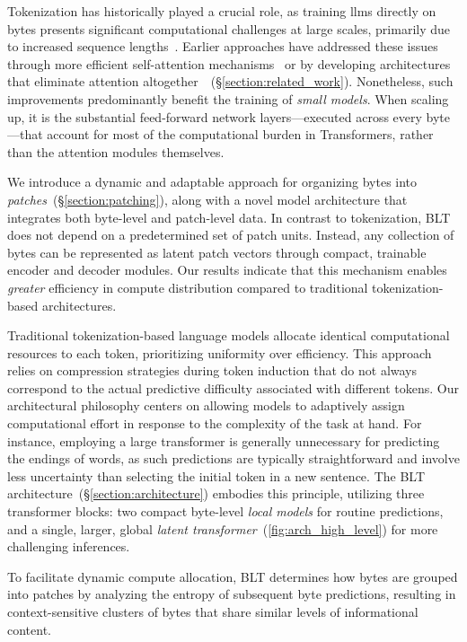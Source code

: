 Tokenization has historically played a crucial role, as training llms directly on bytes presents significant computational challenges at large scales, primarily due to increased sequence lengths~\citep{xue2022byt5}. Earlier approaches have addressed these issues through more efficient self-attention mechanisms~\citep{el2020characterbert, clark2022canine} or by developing architectures that eliminate attention altogether~\citep{wang2024mambabyte}~(\S\ref{section:related_work}). Nonetheless, such improvements predominantly benefit the training of \textit{small models}. When scaling up, it is the substantial feed-forward network layers—executed across every byte—that account for most of the computational burden in Transformers, rather than the attention modules themselves.

We introduce a dynamic and adaptable approach for organizing bytes into \textit{patches}~(\S\ref{section:patching}), along with a novel model architecture that integrates both byte-level and patch-level data. In contrast to tokenization, {\textsc BLT} does not depend on a predetermined set of patch units. Instead, any collection of bytes can be represented as latent patch vectors through compact, trainable encoder and decoder modules. Our results indicate that this mechanism enables \textit{greater} efficiency in compute distribution compared to traditional tokenization-based architectures.

Traditional tokenization-based language models allocate identical computational resources to each token, prioritizing uniformity over efficiency. This approach relies on compression strategies during token induction that do not always correspond to the actual predictive difficulty associated with different tokens. Our architectural philosophy centers on allowing models to adaptively assign computational effort in response to the complexity of the task at hand. For instance, employing a large transformer is generally unnecessary for predicting the endings of words, as such predictions are typically straightforward and involve less uncertainty than selecting the initial token in a new sentence. The {\textsc BLT} architecture~(\S\ref{section:architecture}) embodies this principle, utilizing three transformer blocks: two compact byte-level \textit{local models} for routine predictions, and a single, larger, global \textit{latent transformer}~(\autoref{fig:arch_high_level}) for more challenging inferences. 

To facilitate dynamic compute allocation, {\textsc BLT} determines how bytes are grouped into patches by analyzing the entropy of subsequent byte predictions, resulting in context-sensitive clusters of bytes that share similar levels of informational content.

